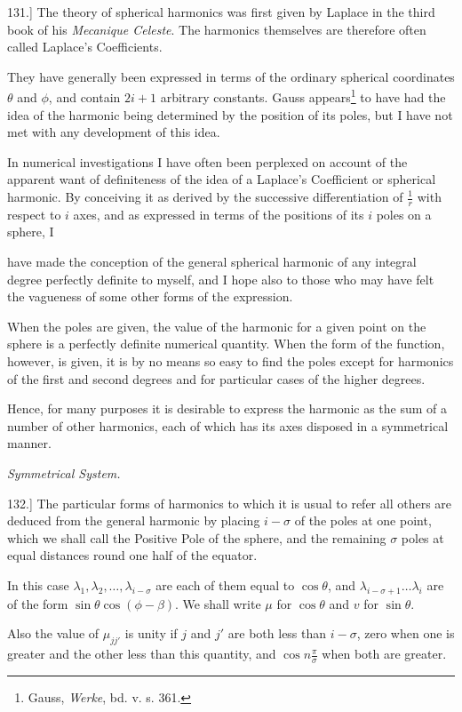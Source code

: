 \documentclass[11pt,a4paper]{article}
\begin{document}
131.] The theory of spherical harmonics was first given by Laplace in the third book of his \emph{Mecanique Celeste}. The harmonics themselves are therefore often called Laplace's Coefficients.

They have generally been expressed in terms of the ordinary spherical coordinates $\theta$ and $\phi$, and contain $2i+1$ arbitrary constants. Gauss appears\footnote{Gauss, \emph{Werke}, bd. v. s. 361.} to have had the idea of the harmonic being determined by the position of its poles, but I have not met with any development of this idea.

In numerical investigations I have often been perplexed on account of the apparent want of definiteness of the idea of a Laplace's Coefficient or spherical harmonic. By conceiving it as derived by the successive differentiation of $\frac{1}{r}$ with respect to $i$ axes, and as expressed in terms of the positions of its $i$ poles on a sphere, I

have made the conception of the general spherical harmonic of any integral degree perfectly definite to myself, and I hope also to those who may have felt the vagueness of some other forms of the expression.

When the poles are given, the value of the harmonic for a given point on the sphere is a perfectly definite numerical quantity. When the form of the function, however, is given, it is by no means so easy to find the poles except for harmonics of the first and second degrees and for particular cases of the higher degrees.

Hence, for many purposes it is desirable to express the harmonic as the sum of a number of other harmonics, each of which has its axes disposed in a symmetrical manner.

{\centering\itshape Symmetrical System.\par}

132.] The particular forms of harmonics to which it is usual to refer all others are deduced from the general harmonic by placing $i-\sigma$ of the poles at one point, which we shall call the Positive Pole of the sphere, and the remaining $\sigma$ poles at equal distances round one half of the equator.

In this case $\lambda_1,\lambda_2,\ldots,\lambda_{i-\sigma}$ are each of them equal to $\cos\theta$, and $\lambda_{i-\sigma+1}\ldots\lambda_i$ are of the form $\sin\theta\cos(\phi-\beta)$. We shall write $\mu$ for $\cos\theta$ and $v$ for $\sin\theta$.

Also the value of $\mu_{jj'}$ is unity if $j$ and $j'$ are both less than $i-\sigma$, zero when one is greater and the other less than this quantity, and $\cos n\frac{\pi}{\sigma}$ when both are greater.
\end{document}
